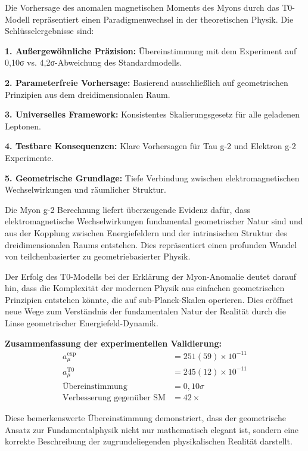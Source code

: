 \documentclass[12pt,a4paper]{report}
\begin{document}
Die Vorhersage des anomalen magnetischen Moments des Myons durch das T0-Modell repräsentiert einen Paradigmenwechsel in der theoretischen Physik. Die Schlüsselergebnisse sind:

\textbf{1. Außergewöhnliche Präzision:}
Übereinstimmung mit dem Experiment auf 0,10σ vs. 4,2σ-Abweichung des Standardmodells.

\textbf{2. Parameterfreie Vorhersage:}
Basierend ausschließlich auf geometrischen Prinzipien aus dem dreidimensionalen Raum.

\textbf{3. Universelles Framework:}
Konsistentes Skalierungsgesetz für alle geladenen Leptonen.

\textbf{4. Testbare Konsequenzen:}
Klare Vorhersagen für Tau g-2 und Elektron g-2 Experimente.

\textbf{5. Geometrische Grundlage:}
Tiefe Verbindung zwischen elektromagnetischen Wechselwirkungen und räumlicher Struktur.

\begin{tcolorbox}[colback=green!5!white,colframe=green!75!black,title=Fundamentale Schlussfolgerung]
	Die Myon g-2 Berechnung liefert überzeugende Evidenz dafür, dass elektromagnetische Wechselwirkungen fundamental geometrischer Natur sind und aus der Kopplung zwischen Energiefeldern und der intrinsischen Struktur des dreidimensionalen Raums entstehen. Dies repräsentiert einen profunden Wandel von teilchenbasierter zu geometriebasierter Physik.
\end{tcolorbox}

Der Erfolg des T0-Modells bei der Erklärung der Myon-Anomalie deutet darauf hin, dass die Komplexität der modernen Physik aus einfachen geometrischen Prinzipien entstehen könnte, die auf sub-Planck-Skalen operieren. Dies eröffnet neue Wege zum Verständnis der fundamentalen Natur der Realität durch die Linse geometrischer Energiefeld-Dynamik.

\textbf{Zusammenfassung der experimentellen Validierung:}
\begin{align}
	a_\mu^{\text{exp}} &= 251(59) \times 10^{-11} \\
	a_\mu^{\text{T0}} &= 245(12) \times 10^{-11} \\
	\text{Übereinstimmung} &= 0,10\sigma \\
	\text{Verbesserung gegenüber SM} &= 42 \times
\end{align}

Diese bemerkenswerte Übereinstimmung demonstriert, dass der geometrische Ansatz zur Fundamentalphysik nicht nur mathematisch elegant ist, sondern eine korrekte Beschreibung der zugrundeliegenden physikalischen Realität darstellt.
\end{document}
